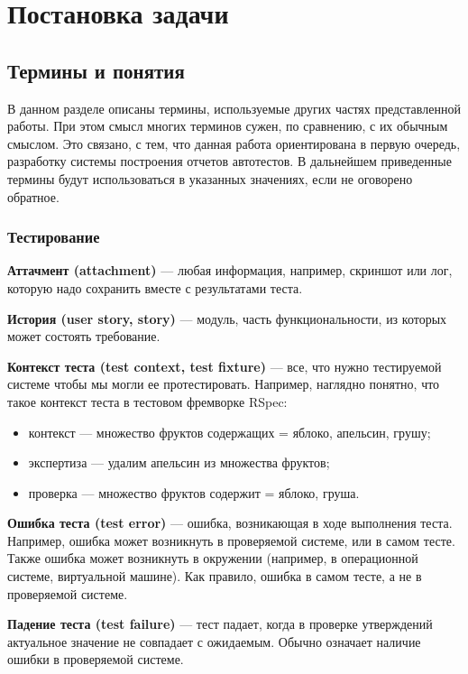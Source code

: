 \chapter{Постановка задачи}
\label{chapter1}

\section{Термины и понятия}

В данном разделе описаны термины, используемые других частях представленной работы. При этом смысл многих терминов сужен, по сравнению, с их обычным смыслом. Это связано, с тем, что данная работа ориентирована в первую очередь, разработку системы построения отчетов автотестов. В дальнейшем приведенные термины будут использоваться в указанных значениях, если не оговорено обратное.

\subsection{Тестирование}

{\bf Аттачмент (attachment)} ---
любая информация, например, скриншот или лог, которую надо сохранить вместе с результатами теста.  

{\bf История (user story, story)} ---
модуль, часть функциональности, из которых может состоять требование.

{\bf Контекст теста (test context, test fixture)} ---
все, что нужно тестируемой системе чтобы мы могли ее протестировать. Например, наглядно понятно, что такое контекст теста в тестовом фремворке RSpec:

\begin{itemize}
\item контекст --- множество фруктов содержащих = {яблоко, апельсин, грушу};
\item экспертиза --- удалим апельсин из множества фруктов;
\item проверка --- множество фруктов содержит = {яблоко, груша}.
\end{itemize}

{\bf Ошибка теста (test error)} ---
ошибка, возникающая в ходе выполнения теста. Например, ошибка может возникнуть в проверяемой системе, или в самом тесте. Также ошибка может возникнуть в окружении (например, в операционной системе, виртуальной машине). Как правило, ошибка в самом тесте, а не в проверяемой системе.

{\bf Падение теста (test failure)} ---
тест падает, когда в проверке утверждений актуальное значение не совпадает с ожидаемым. Обычно означает наличие ошибки в проверяемой системе.

